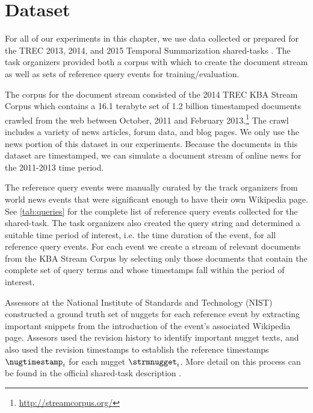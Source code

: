 \section{Dataset}

For all of our experiments in this chapter, we use data collected or prepared 
for the TREC 2013, 2014, and 2015 Temporal Summarization shared-tasks
\citep{aslam2013,aslam2015,aslam2016}. The task organizers provided both a corpus
with which to create the document stream as well as sets of reference
query events for training/evaluation. 

The corpus for the document stream consisted of the 2014 TREC KBA Stream
Corpus \citep{frank2013} which contains a 16.1 terabyte set of 1.2 billion
timestamped documents crawled from the web between October, 2011 and February
2013.\footnote{\url{http://streamcorpus.org/}} The crawl includes a variety of
news articles, forum data, and blog pages.  We only use the news portion of
this dataset in our experiments.  Because the documents in this dataset are
timestamped, we can simulate a document stream of online news for the
2011-2013 time period.


The reference query events were manually curated by the track organizers from
 world news events that were significant enough to have their own
Wikipedia page. See \autoref{tab:queries} for the complete list of 
reference query events collected for the shared-task. The task organizers
also created the query string and determined a suitable
 time period of interest, i.e. the time duration of the event, for all
reference query events. 
For each event we create a stream of relevant 
documents from the KBA Stream Corpus by selecting only those documents that contain the complete set of query 
terms and whose timestamps fall within the period of interest. 




Assessors at the National Institute of Standards and Technology (NIST) constructed a ground truth set of nuggets for each reference event by extracting 
important snippets from the introduction of the event's associated Wikipedia page.
Assesors used the revision history to identify important nugget texts,
and also used the revision timestamps to establish the reference 
timestamps $\nugtimestamp_i$ for each nugget $\strmnugget_i$.
More detail
on this process can be found in the official shared-task  description \citep{aslam2013}.
